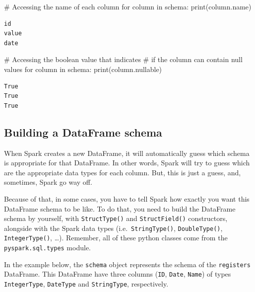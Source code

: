 \documentclass[
  11pt,
  letterpaper,
  DIV=11,
  numbers=noendperiod]{scrreprt}
\newenvironment{Shaded}{\begin{snugshade}}{\end{snugshade}}
\newcommand{\BuiltInTok}[1]{\textcolor[rgb]{0.00,0.23,0.31}{#1}}
\newcommand{\CommentTok}[1]{\textcolor[rgb]{0.37,0.37,0.37}{#1}}
\newcommand{\ControlFlowTok}[1]{\textcolor[rgb]{0.00,0.23,0.31}{#1}}
\newcommand{\KeywordTok}[1]{\textcolor[rgb]{0.00,0.23,0.31}{#1}}
\newcommand{\NormalTok}[1]{\textcolor[rgb]{0.00,0.23,0.31}{#1}}
\begin{document}
\begin{Shaded}
\begin{Highlighting}[]
\CommentTok{\# Accessing the name of each column}
\ControlFlowTok{for}\NormalTok{ column }\KeywordTok{in}\NormalTok{ schema:}
  \BuiltInTok{print}\NormalTok{(column.name)}
\end{Highlighting}
\end{Shaded}

\begin{verbatim}
id
value
date
\end{verbatim}

\begin{Shaded}
\begin{Highlighting}[]
\CommentTok{\# Accessing the boolean value that indicates}
\CommentTok{\# if the column can contain null values}
\ControlFlowTok{for}\NormalTok{ column }\KeywordTok{in}\NormalTok{ schema:}
  \BuiltInTok{print}\NormalTok{(column.nullable)}
\end{Highlighting}
\end{Shaded}

\begin{verbatim}
True
True
True
\end{verbatim}

\hypertarget{building-a-dataframe-schema}{%
\subsection{Building a DataFrame
schema}\label{building-a-dataframe-schema}}

When Spark creates a new DataFrame, it will automatically guess which
schema is appropriate for that DataFrame. In other words, Spark will try
to guess which are the appropriate data types for each column. But, this
is just a guess, and, sometimes, Spark go way off.

Because of that, in some cases, you have to tell Spark how exactly you
want this DataFrame schema to be like. To do that, you need to build the
DataFrame schema by yourself, with \texttt{StructType()} and
\texttt{StructField()} constructors, alongside with the Spark data types
(i.e.~\texttt{StringType()}, \texttt{DoubleType()},
\texttt{IntegerType()}, \ldots). Remember, all of these python classes
come from the \texttt{pyspark.sql.types} module.

In the example below, the \texttt{schema} object represents the schema
of the \texttt{registers} DataFrame. This DataFrame have three columns
(\texttt{ID}, \texttt{Date}, \texttt{Name}) of types
\texttt{IntegerType}, \texttt{DateType} and \texttt{StringType},
respectively.
\end{document}
